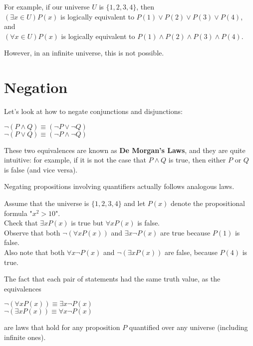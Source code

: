 \documentclass[12pt,a4paper]{article}
\begin{document}
For example, if our universe $U$ is $\{1,2,3,4\}$, then \\
$(\exists x \in U)P(x)$ is logically equivalent to $P(1)\vee P(2)\vee P(3)\vee P(4)$, and \\
$(\forall x \in U)P(x)$ is logically equivalent to $P(1)\wedge P(2) \wedge P(3) \wedge P(4)$.
 
\bigbreak
 
However, in an infinite universe, this is not possible.

\section*{Negation}

Let's look at how to negate conjunctions and disjunctions:
\begin{center}
 	$\neg(P\wedge Q)\equiv(\neg P\vee\neg Q)$ \\
 	$\neg(P\vee Q)\equiv(\neg P\wedge\neg Q)$
\end{center}

These two equivalences are known as \textbf{De Morgan's Laws}, and they are quite intuitive: for example, if it is not the case that $P\wedge Q$ is true, then either $P$ or $Q$ is false (and vice versa).

\bigbreak

Negating propositions involving quantifiers actually follows analogous laws.

\bigbreak

Assume that the universe is $\{1,2,3,4\}$ and let $P(x)$ denote the propositional formula "$x^2>10$". \\
Check that $\exists xP(x)$ is true but $\forall xP(x)$ is false. \\
Observe that both $\neg(\forall xP(x))$ and $\exists x\neg P(x)$ are true because $P(1)$ is false. \\
Also note that both $\forall x\neg P(x)$ and $\neg(\exists xP(x))$ are false, because $P(4)$ is true.

\bigbreak

The fact that each pair of statements had the same truth value, as the equivalences
\begin{center}
	$\neg(\forall xP(x))\equiv\exists x\neg P(x)$ \\
	$\neg(\exists xP(x))\equiv \forall x\neg P(x)$
\end{center}
are laws that hold for any proposition $P$ quantified over any universe (including infinite ones).
\end{document}
